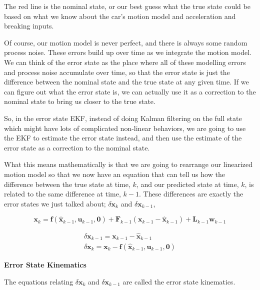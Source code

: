 The red line is the nominal state, or our best guess what the true state could
be based on what we know about the car's motion model and acceleration and breaking inputs. 

Of course, our motion model is never perfect, and there is always some random process noise. These errors build up over time as we integrate
the motion model. We can think of the error state as the place where all of these modelling errors and process noise
accumulate over time, so that the error state is just the difference between the nominal state and the true state at any given time. 
If we can figure out what the error state is, we can actually use it as a correction to the nominal state to bring us closer to
the true state. 

So, in the error state EKF, instead of doing Kalman filtering on the full state
which might have lots of complicated non-linear behaviors, we are going to use the EKF to estimate the error
state instead, and then use the estimate of the error state as a correction to the nominal state. 

What this means mathematically is that we are going to rearrange our
linearized motion model so that we now have an equation that can tell us how the difference between the true state at time, $k$, and our predicted
state at time, $k$, is related to the same difference at time, $k-1$. These differences
are exactly the error states we just talked about; $\delta \mathbf{x}_k$  and
$\delta \mathbf{x}_{k-1}$, 

\begin{equation}
\mathbf{x}_k = \mathbf{f}(\hat{\mathbf{x}}_{k-1}, \mathbf{u}_{k-1}, \mathbf{0}) + \mathbf{F}_{k-1}(\mathbf{x}_{k-1} - \hat{\mathbf{x}}_{k-1}) + \mathbf{L}_{k-1}\mathbf{w}_{k-1}
\end{equation}

\begin{eqnarray}
\delta \mathbf{x}_{k-1} = \mathbf{x}_{k-1} - \hat{\mathbf{x}}_{k-1} \\
\delta \mathbf{x}_{k} = \mathbf{x}_{k} - \mathbf{f}(\hat{\mathbf{x}}_{k-1}, \mathbf{u}_{k-1}, \mathbf{0})
\end{eqnarray}

\begin{framed}
\theoremstyle{remark}
\begin{remark}{\textbf{Error State Kinematics}}

The equations relating $\delta \mathbf{x}_k$  and $\delta \mathbf{x}_{k-1}$  are called the error state kinematics.
\end{remark}
\end{framed}

